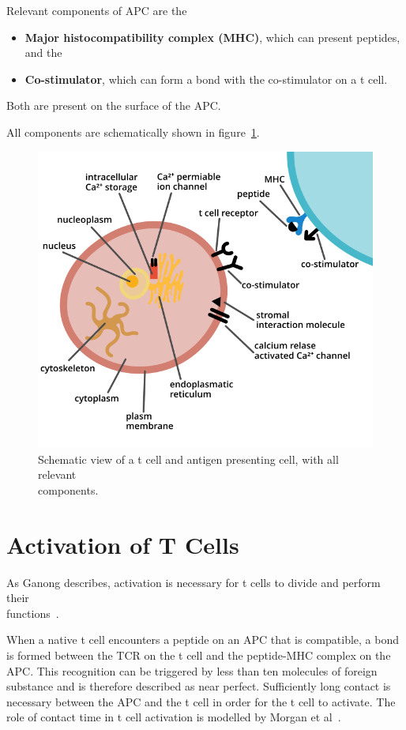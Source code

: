Relevant components of APC are the
\begin{itemize}
	\item \textbf{Major histocompatibility complex (MHC)}, which can present peptides, and the
	\item \textbf{Co-stimulator}, which can form a bond with the co-stimulator on a t cell.
\end{itemize}

Both are present on the surface of the APC.

All components are schematically shown in figure~\ref{fig:tcellcomponents}.

\begin{figure}[h]
	\centering
	\includegraphics[width=\linewidth]{fig/t_cell_components}
	\caption{Schematic view of a t cell and antigen presenting cell, with all relevant\\ components.}
	\label{fig:tcellcomponents}
\end{figure}

\newpage
\section{Activation of T Cells}
\label{sec:t-cell/activation}

As Ganong describes, activation is necessary for t cells to divide and perform their\\ functions~\cite{Ganong1997}.

When a native t cell encounters a peptide on an APC that is compatible, a bond is formed between the TCR on the t cell and the peptide-MHC complex on the APC. This recognition can be triggered by less than ten molecules of foreign substance and is therefore described as near perfect. Sufficiently long contact is necessary between the APC and the t cell in order for the t cell to activate. The role of contact time in t cell activation is modelled by Morgan et al~\cite{morgan2023}.

